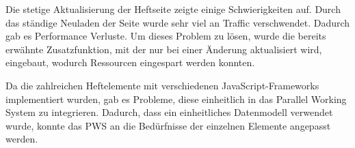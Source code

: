 \newpage

Die stetige Aktualisierung der Heftseite zeigte einige Schwierigkeiten auf. Durch das ständige Neuladen der Seite wurde sehr viel an Traffic verschwendet. Dadurch gab es Performance Verluste. Um dieses Problem zu lösen, wurde die bereits erwähnte Zusatzfunktion, mit der nur bei einer Änderung aktualisiert wird, eingebaut, wodurch Ressourcen eingespart werden konnten.

Da die zahlreichen Heftelemente mit verschiedenen JavaScript-Frameworks implementiert wurden, gab es Probleme, diese einheitlich in das Parallel Working System zu integrieren. Dadurch, dass ein einheitliches Datenmodell verwendet wurde, konnte das PWS an die Bedürfnisse der einzelnen Elemente angepasst werden. 